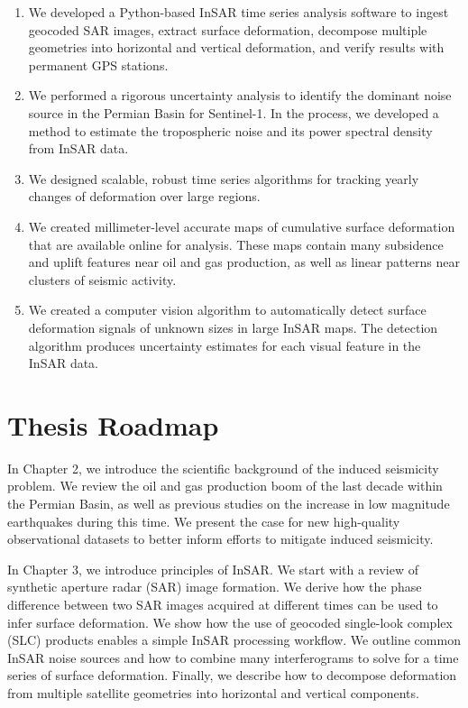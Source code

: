 \begin{enumerate}
	
	\item We developed a Python-based InSAR time series analysis software to ingest geocoded SAR images, extract surface deformation, decompose multiple geometries into horizontal and vertical deformation, and verify results with permanent GPS stations.
	
	\item We performed a rigorous uncertainty analysis to identify the dominant noise source in the Permian Basin for Sentinel-1.  In the process, we developed a method to estimate the tropospheric noise and its power spectral density from InSAR data.
	
	
	\item We designed scalable, robust time series algorithms for tracking yearly changes of deformation over large regions.
	
	\item We created millimeter-level accurate maps of cumulative surface deformation that are available online for analysis. These maps contain many subsidence and uplift features near oil and gas production, as well as linear patterns near clusters of seismic activity.
	
	
	\item We created a computer vision algorithm to automatically detect surface deformation signals of unknown sizes in large InSAR maps. The detection algorithm produces uncertainty estimates for each visual feature in the InSAR data.
	
	
	
\end{enumerate}


\section{Thesis Roadmap}
\label{sec:chap1-roadmap}

In Chapter 2, we introduce the scientific background of the induced seismicity problem. We review the oil and gas production boom of the last decade within the Permian Basin, as well as previous studies on the increase in low magnitude earthquakes during this time. We present the case for new high-quality observational datasets to better inform efforts to mitigate induced seismicity.

In Chapter 3, we introduce principles of InSAR. We start with a review of synthetic aperture radar (SAR) image formation. We derive how the phase difference between two SAR images acquired at different times can be used to infer surface deformation. We show how the use of geocoded single-look complex (SLC) products enables a simple InSAR processing workflow. We outline common InSAR noise sources and how to combine many interferograms to solve for a time series of surface deformation. Finally, we describe how to decompose deformation from multiple satellite geometries into horizontal and vertical components.


